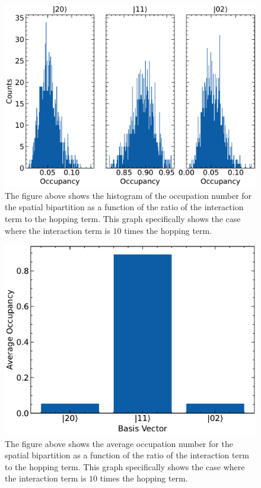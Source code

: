 \begin{figure}[H]
\centering
\includegraphics[scale=0.5]{../figures/sep_occ_hist_U_10.0000.pdf}
\caption{The figure above shows the histogram of the occupation number for the spatial bipartition as a function of the ratio of the interaction term to the hopping term. This graph specifically shows the case where the interaction term is $10$ times the hopping term.}
\label{fig:spatial_occ_hist_U_10.0000}
\end{figure}

\begin{figure}[H]
\centering
\includegraphics[scale=0.5]{../figures/spatial_avg_occ_U_10.0000.pdf}
\caption{The figure above shows the average occupation number for the spatial bipartition as a function of the ratio of the interaction term to the hopping term. This graph specifically shows the case where the interaction term is $10$ times the hopping term.}
\label{fig:spatial_avg_occ_U_10.0000}    
\end{figure}


